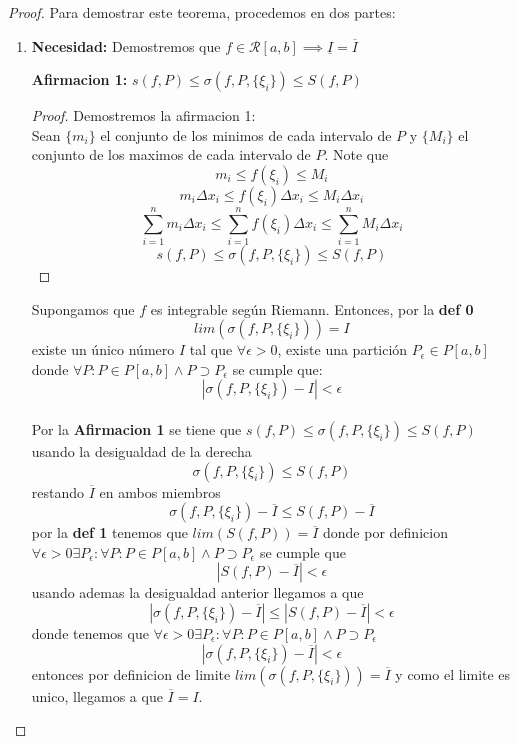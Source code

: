 \documentclass{article}
\begin{document}
\begin{proof}
Para demostrar este teorema, procedemos en dos partes:
\begin{enumerate}
    \item \textbf{Necesidad:} 
Demostremos que  \(f \in \mathcal{R}[a, b] \implies \underline{I} = \overline{I} \)

\textbf{Afirmacion 1:} \(s(f, P) \leq \sigma(f, P,\{\xi_i\}) \leq S(f, P)\)

\begin{proof}
Demostremos la afirmacion 1:\\

Sean \(\{m_i\}\) el conjunto de los minimos de cada intervalo de \(P\) y \(\{M_i\}\) el conjunto de los maximos de cada intervalo de \(P\).
Note que 
\[
m_i \leq f(\xi_i) \leq M_i
\]
\[
m_i \Delta x_i \leq f(\xi_i)\Delta x_i \leq M_i\Delta x_i
\] 
\[
\sum_{i = 1}^{n} m_i \Delta x_i \leq \sum_{i = 1}^{n} f(\xi_i)\Delta x_i \leq \sum_{i = 1}^{n} M_i\Delta x_i
\]
\[
s(f, P) \leq \sigma(f, P,\{\xi_i\}) \leq S(f, P)
\]
\end{proof}

 Supongamos que \( f \) es integrable según Riemann. Entonces, por la \textbf{def 0}
\[
lim(\sigma(f, P,\{\xi_i\})) = I
\]
existe un único número \( I \) tal que \( \forall \epsilon > 0 \), existe una partición \( P_\epsilon \in P[a, b]\)  donde \(\forall P: P \in P[a, b] \wedge P \supset P_\epsilon\) se cumple que:
    \[
    |\sigma(f, P,\{\xi_i\}) - I| < \epsilon
    \]\\
Por la \textbf{Afirmacion 1} se tiene que \(s(f, P) \leq \sigma(f, P,\{\xi_i\}) \leq S(f, P)\) usando la desigualdad de la derecha 
\[
\sigma(f, P,\{\xi_i\}) \leq S(f, P)
\]
restando \(\overline{I}\) en ambos miembros
\[
\sigma(f, P,\{\xi_i\}) - \overline{I} \leq S(f, P) - \overline{I}
\]
por la \textbf{def 1} tenemos que \(lim (S(f, P)) = \overline{I}\) donde por definicion\\
\(\forall \epsilon > 0 \exists P_\epsilon: \forall P: P \in P[a, b] \wedge P \supset P_\epsilon\) se cumple que
\[
 |S(f, P) - \overline{I}| < \epsilon
\]
usando ademas la desigualdad anterior llegamos a que
\[
|\sigma(f, P,\{\xi_i\}) - \overline{I}| \leq |S(f, P) - \overline{I}| < \epsilon
\]
donde tenemos que  \(\forall \epsilon > 0 \exists P_\epsilon: \forall P: P \in P[a, b] \wedge P \supset P_\epsilon\)
\[
|\sigma(f, P,\{\xi_i\}) - \overline{I}| < \epsilon 
\]
entonces por definicion de limite \(lim( \sigma(f, P,\{\xi_i\})) = \overline{I}\) y como el limite es unico, llegamos a que \(\overline{I} = I\).\\


\end{enumerate}
\end{proof}
\end{document}
